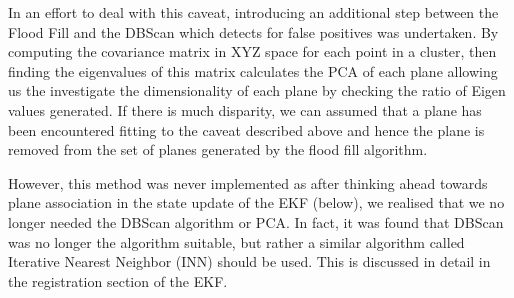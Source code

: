 \documentclass[]{article}
\begin{document}
{In an effort to deal with this caveat, introducing an additional step between the Flood Fill and the DBScan which detects for false positives was undertaken. By computing the covariance matrix in XYZ space for each point in a cluster, then finding the eigenvalues of this matrix calculates the \ac{PCA} of each plane allowing us the investigate the dimensionality of each plane by checking the ratio of Eigen values generated. If there is much disparity, we can assumed that a plane has been encountered fitting to the caveat described above and hence the plane is removed from the set of planes generated by the flood fill algorithm. 


However, this method was never implemented as after thinking ahead towards plane association in the state update of the EKF (below), we realised that we no longer needed the DBScan algorithm or \ac{PCA}.  In fact, it was found that DBScan was no longer the algorithm suitable, but rather a similar algorithm called Iterative Nearest Neighbor (INN) should be used. This is discussed in detail in the registration section of the EKF.












\begin{figure}[tbp]
	\centering
	

\end{figure}}
\end{document}
